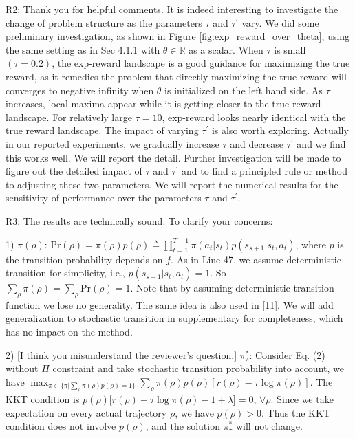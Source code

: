 \documentclass{article}
\begin{document}
R2: Thank you for helpful comments. It is indeed interesting to investigate the 
change of problem structure as the parameters $\tau$ and $\tau^\prime$ vary. 
We did some preliminary investigation, as shown in Figure \ref{fig:exp_reward_over_theta}, using the same setting as in Sec 4.1.1 with $\theta \in \mathbb{R}$ as a scalar. When $\tau$ is small $(\tau =0.2)$, the exp-reward landscape is a good guidance for maximizing the true reward, as it remedies the problem that directly maximizing the true reward will converges to negative infinity when $\theta$ is initialized on the left hand side. As $\tau$ increases, local maxima appear while it is getting closer to the true reward landscape. For relatively large $\tau = 10$, exp-reward looks nearly identical with the true reward landscape. The impact of varying $\tau^\prime$ is also worth exploring. Actually in our reported experiments, we gradually increase $\tau$ and decrease $\tau^\prime$ and we find this works well. We will report the detail. Further investigation will be made to figure out the detailed impact of $\tau$ and $\tau^\prime$ and to find a principled rule or method to adjusting these two parameters. We will report the numerical results for the sensitivity of performance over the parameters $\tau$ and $\tau^\prime$.

R3:
The results are technically sound. To clarify your concerns:

 1) $\pi(\rho)$: $\text{Pr}(\rho) = \pi(\rho) p(\rho) \triangleq \prod_{t=1}^{T-1}{ \pi(a_t | s_t) p(s_{s+1} | s_t, a_t)}$, where $p$ is the transition probability depends on $f$. As in Line 47, we assume deterministic transition for simplicity, i.e., $p(s_{s+1} | s_t, a_t) = 1$. So $\sum_{\rho}{\pi(\rho)} = \sum_{\rho}{\text{Pr}(\rho)} = 1$. Note that by assuming deterministic transition function we lose no generality. The same idea is also used in [11]. We  will add generalization to stochastic transition in supplementary for completeness, which has no impact on the method.

2) [I think you misunderstand the reviewer's question.] $\pi_{\tau}^{*}$: Consider Eq. (2) without $\Pi$ constraint and take stochastic transition probability into account, we have $\max_{\pi \in \{ \pi | \sum_{\rho}{\pi(\rho)p(\rho) = 1} \}}{\sum_{\rho}{\pi(\rho)p(\rho)[ r(\rho) - \tau \log{\pi(\rho)}]}}$. The KKT condition is $p(\rho) [ r(\rho) - \tau \log{\pi(\rho)  - 1 + \lambda]} = 0$, $\forall \rho$. Since we take expectation on every actual trajectory $\rho$, we have $p(\rho) > 0$. Thus the KKT condition does not involve $p(\rho)$, and the solution $\pi_{\tau}^{*}$ will not change.
\end{document}
